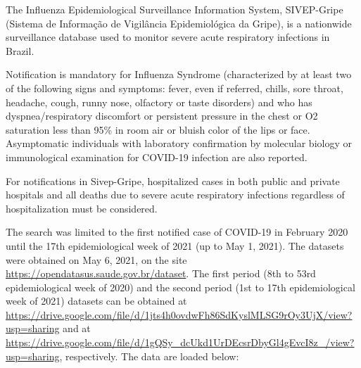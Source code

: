 \documentclass[
]{article}
\begin{document}
The Influenza Epidemiological Surveillance Information System,
SIVEP-Gripe (Sistema de Informação de Vigilância Epidemiológica da
Gripe), is a nationwide surveillance database used to monitor severe
acute respiratory infections in Brazil.

Notification is mandatory for Influenza Syndrome (characterized by at
least two of the following signs and symptoms: fever, even if referred,
chills, sore throat, headache, cough, runny nose, olfactory or taste
disorders) and who has dyspnea/respiratory discomfort or persistent
pressure in the chest or O2 saturation less than 95\% in room air or
bluish color of the lips or face. Asymptomatic individuals with
laboratory confirmation by molecular biology or immunological
examination for COVID-19 infection are also reported.

For notifications in Sivep-Gripe, hospitalized cases in both public and
private hospitals and all deaths due to severe acute respiratory
infections regardless of hospitalization must be considered.

The search was limited to the first notified case of COVID-19 in
February 2020 until the 17th epidemiological week of 2021 (up to May 1,
2021). The datasets were obtained on May 6, 2021, on the site
\url{https://opendatasus.saude.gov.br/dataset}. The first period (8th to
53rd epidemiological week of 2020) and the second period (1st to 17th
epidemiological week of 2021) datasets can be obtained at
\url{https://drive.google.com/file/d/1jts4h0ovdwFh86SdKyslMLSG9rOy3UjX/view?usp=sharing}
and at
\url{https://drive.google.com/file/d/1gQSy_dcUkd1UrDEcsrDbyGl4gEvcI8z_/view?usp=sharing},
respectively. The data are loaded below:
\end{document}
